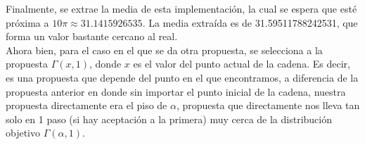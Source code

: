 \documentclass[letterpaper]{article}
\newcommand{\1}{\mathds{1}}
\theoremstyle{definition}
\theoremstyle{definition}
\theoremstyle{definition}
\theoremstyle{definition}
\theoremstyle{definition}
\begin{document}
    Finalmente, se extrae la media de esta implementación, la cual se espera que esté próxima a $10\pi\approx31.1415926535$. La media extraída es de 31.59511788242531, que forma un 
    valor bastante cercano al real. \\

    Ahora bien, para el caso en el que se da otra propuesta, se selecciona a la propuesta $\Gamma(x,1)$, donde $x$ es el valor del punto actual de la cadena. Es decir, es 
    una propuesta que depende del punto en el que encontramos, a diferencia de la propuesta anterior en donde sin importar el punto inicial de la cadena, nuestra propuesta 
    directamente era el piso de $\alpha$, propuesta que directamente nos lleva tan solo en 1 paso (si hay aceptación a la primera) muy cerca de la distribución objetivo $\Gamma(\alpha,1)$.
    \\
\end{document}
